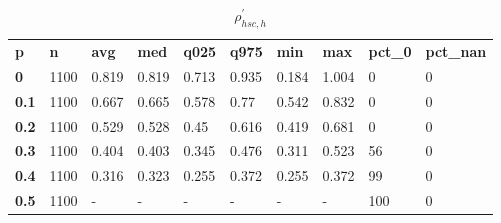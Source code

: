 \begin{table}[h]
 \centering 
\footnotesize
\caption{$\rho_{hsc,h}^\prime $}
\label{tab:alphahsch}
\begin{tabular}[h]{| l l l l l l l l l l|
    } \hline
\textbf{ p} & \textbf{ n} & \textbf{ avg} & \textbf{ med} & \textbf{ q025} & \textbf{ q975} & \textbf{ min} & \textbf{ max} & \textbf{ pct\_0} & \textbf{ pct\_nan}
           \\
  \textbf{  0} & 1100 & 0.819 & 0.819 & 0.713 & 0.935 & 0.184 & 1.004 &   0 & 0
           \\
  \textbf{0.1} & 1100 & 0.667 & 0.665 & 0.578 &  0.77 & 0.542 & 0.832 &   0 & 0
           \\
  \textbf{0.2} & 1100 & 0.529 & 0.528 &  0.45 & 0.616 & 0.419 & 0.681 &   0 & 0
           \\
  \textbf{0.3} & 1100 & 0.404 & 0.403 & 0.345 & 0.476 & 0.311 & 0.523 &  56 & 0
           \\
  \textbf{0.4} & 1100 & 0.316 & 0.323 & 0.255 & 0.372 & 0.255 & 0.372 &  99 & 0
           \\
  \textbf{0.5} & 1100 & - & - & - & - & - & - & 100 & 0
           \\
 \hline \end{tabular}
 \end{table}

